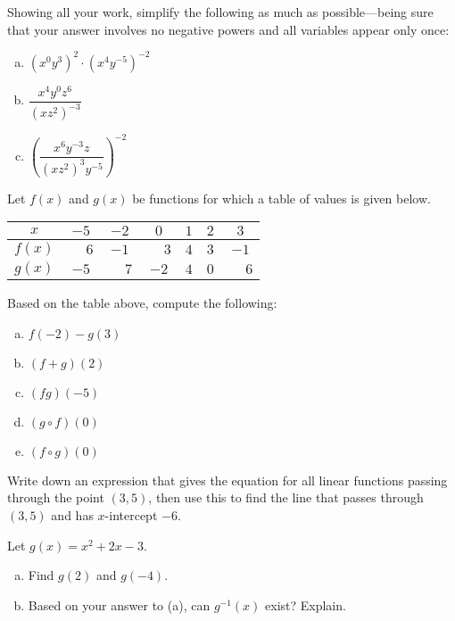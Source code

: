 \documentclass[11pt,letterpaper]{article}
\begin{document}
\prob Showing all your work, simplify the following as much as possible---being sure that your answer involves no negative powers and all variables appear only once:
	\begin{enumerate}[(a)]
	\item $(x^0 y^3)^2 \cdot (x^4 y^{-5})^{-2}$
	\item $\dfrac{x^{4} y^0 z^6}{(x z^2)^{-3}}$
	\item $\left( \dfrac{x^6 y^{-3} z}{(x z^2)^3 y^{-5}} \right)^{-2}$
	\end{enumerate} \pspace





\newpage





\prob  Let $f(x)$ and $g(x)$ be functions for which a table of values is given below. \par
	\begin{table}[ht]
	\centering
	\begin{tabular}{|c||c|c|c|c|c|c|} \hline 
	$x$ & $-5$ & $-2$ & $0$ & $1$ & $2$ & $3$ \\ \hline \hline
	$f(x)$ & $\phantom{-}6$ & $-1$ & $\phantom{-}3$ & $4$ & $3$ & $-1$ \\ \hline
	$g(x)$ & $-5$ & $\phantom{-}7$ & $-2$ & $4$ & $0$ & $\phantom{-}6$ \\ \hline 
	\end{tabular}
	\end{table} \par
Based on the table above, compute the following:
	\begin{enumerate}[(a)]
	\item $f(-2) - g(3)$
	\item $(f + g)(2)$
	\item $(fg)(-5)$
	\item $(g \circ f)(0)$
	\item $(f \circ g)(0)$
	\end{enumerate} \pspace


\prob Write down an expression that gives the equation for all linear functions passing through the point $(3, 5)$, then use this to find the line that passes through $(3, 5)$ and has $x$-intercept $-6$. \pspace


\prob Let $g(x)= x^2 + 2x - 3$. 
	\begin{enumerate}[(a)]
	\item Find $g(2)$ and $g(-4)$.
	\item Based on your answer to (a), can $g^{-1}(x)$ exist? Explain. 
	\end{enumerate} \pspace
\end{document}
